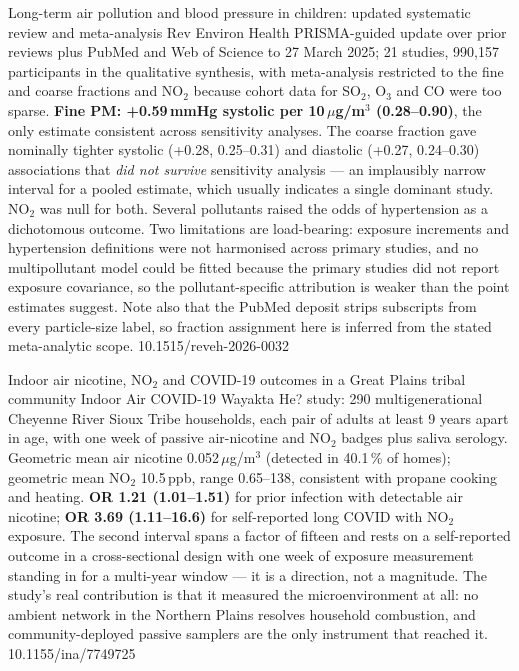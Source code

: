 \documentclass[10pt]{article}
\begin{document}
{Long-term air pollution and blood pressure in children: updated systematic review and meta-analysis}
{Rev Environ Health}
{PRISMA-guided update over prior reviews plus PubMed and Web of Science to 27 March 2025;
21 studies, 990{,}157 participants in the qualitative synthesis, with meta-analysis
restricted to the fine and coarse fractions and NO$_2$ because cohort data for SO$_2$,
O$_3$ and CO were too sparse. \textbf{Fine PM: +0.59\,mmHg systolic per 10\,$\mu$g/m$^3$
(0.28--0.90)}, the only estimate consistent across sensitivity analyses. The coarse
fraction gave nominally tighter systolic (+0.28, 0.25--0.31) and diastolic (+0.27,
0.24--0.30) associations that \emph{did not survive} sensitivity analysis --- an
implausibly narrow interval for a pooled estimate, which usually indicates a single
dominant study. NO$_2$ was null for both. Several pollutants raised the odds of
hypertension as a dichotomous outcome. Two limitations are load-bearing: exposure
increments and hypertension definitions were not harmonised across primary studies, and
no multipollutant model could be fitted because the primary studies did not report
exposure covariance, so the pollutant-specific attribution is weaker than the point
estimates suggest. Note also that the PubMed deposit strips subscripts from every
particle-size label, so fraction assignment here is inferred from the stated
meta-analytic scope.}
{10.1515/reveh-2026-0032}


{Indoor air nicotine, NO$_2$ and COVID-19 outcomes in a Great Plains tribal community}
{Indoor Air}
{COVID-19 Wayakta He? study: 290 multigenerational Cheyenne River Sioux Tribe households,
each pair of adults at least 9 years apart in age, with one week of passive air-nicotine
and NO$_2$ badges plus saliva serology. Geometric mean air nicotine
0.052\,$\mu$g/m$^3$ (detected in 40.1\,\% of homes); geometric mean NO$_2$ 10.5\,ppb,
range 0.65--138, consistent with propane cooking and heating. \textbf{OR 1.21
(1.01--1.51)} for prior infection with detectable air nicotine; \textbf{OR 3.69
(1.11--16.6)} for self-reported long COVID with NO$_2$ exposure. The second interval
spans a factor of fifteen and rests on a self-reported outcome in a cross-sectional
design with one week of exposure measurement standing in for a multi-year window ---
it is a direction, not a magnitude. The study's real contribution is that it measured
the microenvironment at all: no ambient network in the Northern Plains resolves
household combustion, and community-deployed passive samplers are the only instrument
that reached it.}
{10.1155/ina/7749725}
\end{document}

